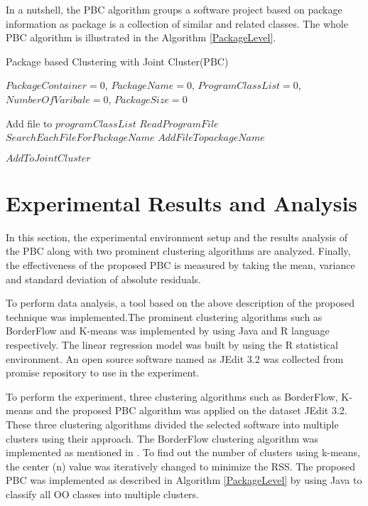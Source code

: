 \documentclass[12pt]{report}
\begin{document}
In a nutshell, the PBC algorithm groups a software project based on package information as package is a collection of similar and related classes. The whole PBC algorithm is illustrated in the Algorithm \ref{PackageLevel}.

\begin{algorithm}
\caption{Package based Clustering with Joint Cluster(PBC)}
\label{PackageLevel}
\begin{algorithmic}[1]
\REQUIRE $PackageContainer = 0$, $ PackageName = 0$, $ ProgramClassList = 0$, $NumberOfVaribale = 0$, $PackageSize = 0$

				\STATE Add file to $programClassList$
		\ENDIF
	\ENDFOR
{}
			\STATE $Read Program File$ 
			\STATE $Search Each File For PackageName $  
				\STATE $Add File To packageName$
			\ENDIF
	\ENDFOR
	
			\STATE $Add To Joint Cluster$
		\ENDIF
	\ENDFOR
\end{algorithmic}
\end{algorithm}
 

\section{Experimental Results and Analysis }

In this section, the experimental environment setup and the results analysis of the PBC along with two prominent clustering algorithms are analyzed. Finally, the effectiveness of the proposed PBC is measured by taking the mean, variance and standard deviation of absolute residuals. 

To perform data analysis, a tool based on the above description of the proposed technique was implemented.The prominent clustering algorithms such as BorderFlow and K-means was implemented by using Java and R language respectively. The linear regression model was built by using the R statistical environment. An open source software named as JEdit 3.2 was collected from promise repository \cite{promise12} to use in the experiment.

To perform the experiment, three clustering algorithms such as BorderFlow, K-means and the proposed PBC algorithm was applied on the dataset JEdit 3.2. These three clustering algorithms divided the selected software into multiple clusters using their approach. The BorderFlow clustering algorithm was implemented as mentioned in \cite{scanniello2013class}. To find out the number of clusters using k-means, the center (n) value was iteratively changed to minimize the RSS. The proposed PBC was implemented as described in Algorithm \ref{PackageLevel} by using Java to classify all OO classes into multiple clusters.
\end{document}
